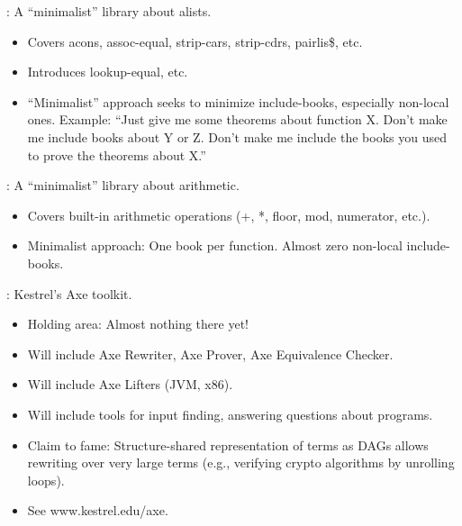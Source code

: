 
\begin{frame}

\newlibtitle

: A ``minimalist'' library about alists.

\begin{itemize}
\item  Covers acons, assoc-equal, strip-cars, strip-cdrs, pairlis\$, etc.
\item Introduces lookup-equal, etc.
\item ``Minimalist'' approach seeks to minimize include-books, especially non-local ones. Example: ``Just give me some theorems about function X.  Don't make me include books about Y or Z.  Don't make me include the books you used to prove the theorems about X.''
\end{itemize}

\end{frame}


\begin{frame}

\newlibtitle

: A ``minimalist'' library about arithmetic.
\begin{itemize}
\item Covers built-in arithmetic operations (+, *, floor, mod, numerator, etc.).
\item Minimalist approach: One book per function.  Almost zero non-local include-books.
\end{itemize}

\end{frame}


\begin{frame}

\newlibtitle

: Kestrel's Axe toolkit.
\begin{itemize}
\item Holding area: Almost nothing there yet!
\item Will include Axe Rewriter, Axe Prover, Axe Equivalence Checker.
\item Will include Axe Lifters (JVM, x86).
\item Will include tools for input finding, answering questions about programs.
\item Claim to fame: Structure-shared representation of terms as DAGs allows
  rewriting over very large terms (e.g., verifying crypto algorithms by
  unrolling loops).
\item See www.kestrel.edu/axe.
\end{itemize}

\end{frame}

